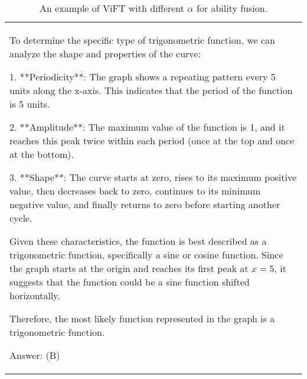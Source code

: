 \begin{table*}[htbp]
\begin{tabular}{p{14cm}}
\begin{tcolorbox}[colback=gray!5, colframe=gray!40, sharp corners, width=\linewidth, boxrule=0.5mm]
To determine the specific type of trigonometric function, we can analyze the shape and properties of the curve:

1. **Periodicity**: The graph shows a repeating pattern every 5 units along the x-axis. This indicates that the period of the function is 5 units.

2. **Amplitude**: The maximum value of the function is 1, and it reaches this peak twice within each period (once at the top and once at the bottom).

3. **Shape**: The curve starts at zero, rises to its maximum positive value, then decreases back to zero, continues to its minimum negative value, and finally returns to zero before starting another cycle.

Given these characteristics, the function is best described as a trigonometric function, specifically a sine or cosine function. Since the graph starts at the origin and reaches its first peak at \( x = 5 \), it suggests that the function could be a sine function shifted horizontally.

Therefore, the most likely function represented in the graph is a trigonometric function.

Answer: (B)


\end{tcolorbox}
\end{tabular}
\caption{An example of ViFT with different $\alpha$ for ability fusion.}
\end{table*}


